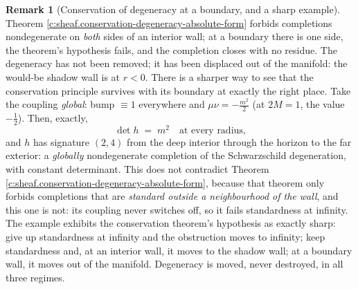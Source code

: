 \documentclass[11pt]{article}
\theoremstyle{definition}
\newtheorem{remark}[theorem]{Remark}
\theoremstyle{plain}
\begin{document}
\begin{remark}[Conservation of degeneracy at a boundary, and a sharp example]\label{c:note.sheaf.conservation-degeneracy-boundary-sharp-example}
Theorem \ref{c:sheaf.conservation-degeneracy-absolute-form} forbids completions nondegenerate on \emph{both} sides of an interior wall; at a boundary there is one side, the theorem's hypothesis fails, and the completion closes with no residue. The degeneracy has not been removed; it has been displaced out of the manifold: the would-be shadow wall is at $r < 0$. There is a sharper way to see that the conservation principle survives with its boundary at exactly the right place. Take the coupling \emph{global}: bump $\equiv 1$ everywhere and $\mu\nu = -\tfrac{m^2}{2}$ (at $2M = 1$, the value $-\tfrac12$). Then, exactly,
\[
\det h \;=\; m^2 \quad \text{at every radius,}
\]
and $h$ has signature $(2,4)$ from the deep interior through the horizon to the far exterior: a \emph{globally} nondegenerate completion of the Schwarzschild degeneration, with constant determinant. This does not contradict Theorem \ref{c:sheaf.conservation-degeneracy-absolute-form}, because that theorem only forbids completions that are \emph{standard outside a neighbourhood of the wall}, and this one is not: its coupling never switches off, so it fails standardness at infinity. The example exhibits the conservation theorem's hypothesis as exactly sharp: give up standardness at infinity and the obstruction moves to infinity; keep standardness and, at an interior wall, it moves to the shadow wall; at a boundary wall, it moves out of the manifold. Degeneracy is moved, never destroyed, in all three regimes.
\end{remark}
\end{document}
